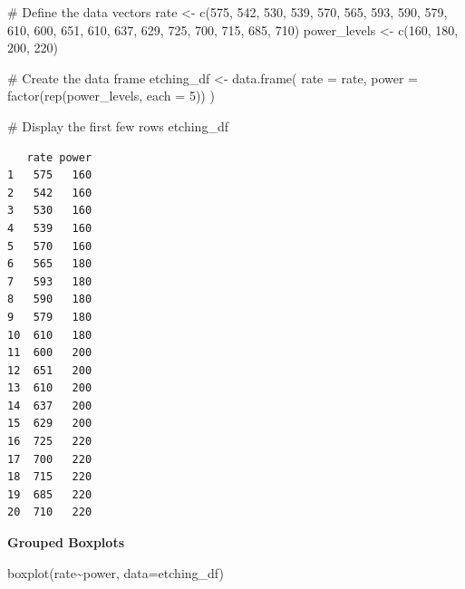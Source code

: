\documentclass[
  letterpaper,
]{scrbook}
\newenvironment{Shaded}{\begin{snugshade}}{\end{snugshade}}
\newcommand{\AttributeTok}[1]{\textcolor[rgb]{0.40,0.45,0.13}{#1}}
\newcommand{\CommentTok}[1]{\textcolor[rgb]{0.37,0.37,0.37}{#1}}
\newcommand{\DecValTok}[1]{\textcolor[rgb]{0.68,0.00,0.00}{#1}}
\newcommand{\FunctionTok}[1]{\textcolor[rgb]{0.28,0.35,0.67}{#1}}
\newcommand{\NormalTok}[1]{\textcolor[rgb]{0.00,0.23,0.31}{#1}}
\newcommand{\OtherTok}[1]{\textcolor[rgb]{0.00,0.23,0.31}{#1}}
\newcommand{\SpecialCharTok}[1]{\textcolor[rgb]{0.37,0.37,0.37}{#1}}
\begin{document}
\begin{Shaded}
\begin{Highlighting}[]
\CommentTok{\# Define the data vectors}
\NormalTok{rate }\OtherTok{\textless{}{-}} \FunctionTok{c}\NormalTok{(}\DecValTok{575}\NormalTok{, }\DecValTok{542}\NormalTok{, }\DecValTok{530}\NormalTok{, }\DecValTok{539}\NormalTok{, }\DecValTok{570}\NormalTok{, }\DecValTok{565}\NormalTok{, }\DecValTok{593}\NormalTok{, }\DecValTok{590}\NormalTok{, }\DecValTok{579}\NormalTok{, }\DecValTok{610}\NormalTok{,}
          \DecValTok{600}\NormalTok{, }\DecValTok{651}\NormalTok{, }\DecValTok{610}\NormalTok{, }\DecValTok{637}\NormalTok{, }\DecValTok{629}\NormalTok{, }\DecValTok{725}\NormalTok{, }\DecValTok{700}\NormalTok{, }\DecValTok{715}\NormalTok{, }\DecValTok{685}\NormalTok{, }\DecValTok{710}\NormalTok{)}
\NormalTok{power\_levels }\OtherTok{\textless{}{-}} \FunctionTok{c}\NormalTok{(}\DecValTok{160}\NormalTok{, }\DecValTok{180}\NormalTok{, }\DecValTok{200}\NormalTok{, }\DecValTok{220}\NormalTok{)}

\CommentTok{\# Create the data frame}
\NormalTok{etching\_df }\OtherTok{\textless{}{-}} \FunctionTok{data.frame}\NormalTok{(}
  \AttributeTok{rate =}\NormalTok{ rate,}
  \AttributeTok{power =} \FunctionTok{factor}\NormalTok{(}\FunctionTok{rep}\NormalTok{(power\_levels, }\AttributeTok{each =} \DecValTok{5}\NormalTok{))}
\NormalTok{)}

\CommentTok{\# Display the first few rows}
\NormalTok{etching\_df}
\end{Highlighting}
\end{Shaded}

\begin{verbatim}
   rate power
1   575   160
2   542   160
3   530   160
4   539   160
5   570   160
6   565   180
7   593   180
8   590   180
9   579   180
10  610   180
11  600   200
12  651   200
13  610   200
14  637   200
15  629   200
16  725   220
17  700   220
18  715   220
19  685   220
20  710   220
\end{verbatim}

\textbf{Grouped Boxplots}

\begin{Shaded}
\begin{Highlighting}[]
\FunctionTok{boxplot}\NormalTok{(rate}\SpecialCharTok{\textasciitilde{}}\NormalTok{power, }\AttributeTok{data=}\NormalTok{etching\_df)}
\end{Highlighting}
\end{Shaded}
\end{document}
